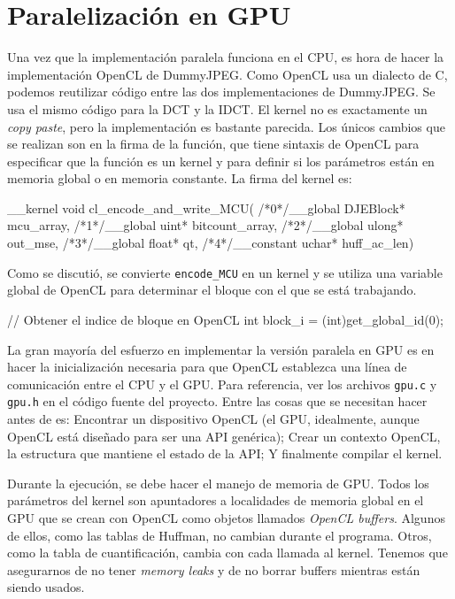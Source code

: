 \section{Paralelización en GPU}

Una vez que la implementación paralela funciona en el CPU, es hora de hacer la
implementación OpenCL de DummyJPEG. Como OpenCL usa un dialecto de C, podemos
reutilizar código entre las dos implementaciones de DummyJPEG. Se usa el mismo
código para la DCT y la IDCT. El kernel no es exactamente un \emph{copy paste},
pero la implementación es bastante parecida. Los únicos cambios que se realizan
son en la firma de la función, que tiene sintaxis de OpenCL para especificar
que la función es un kernel y para definir si los parámetros están en memoria
global o en memoria constante. La firma del kernel es:


\begin{code}[language=C][h]
__kernel void
cl_encode_and_write_MCU(
    /*0*/__global DJEBlock* mcu_array,
    /*1*/__global uint* bitcount_array,
    /*2*/__global ulong* out_mse,
    /*3*/__global float* qt,
    /*4*/__constant uchar* huff_ac_len)
\end{code}

Como se discutió, se convierte \verb+encode_MCU+ en un kernel y se utiliza una
variable global de OpenCL para determinar el bloque con el que se está
trabajando.

\begin{code}[language=C][h]
    // Obtener el indice de bloque en OpenCL
    int block_i = (int)get_global_id(0);
\end{code}

La gran mayoría del esfuerzo en implementar la versión paralela en GPU es en
hacer la inicialización necesaria para que OpenCL establezca una línea de
comunicación entre el CPU y el GPU. Para referencia, ver los archivos
\verb+gpu.c+ y \verb+gpu.h+ en el código fuente del proyecto. Entre las cosas
que se necesitan hacer antes de es: Encontrar un dispositivo OpenCL (el GPU,
idealmente, aunque OpenCL está diseñado para ser una API genérica); Crear un
contexto OpenCL, la estructura que mantiene el estado de la API; Y finalmente
compilar el kernel.

Durante la ejecución, se debe hacer el manejo de memoria de GPU. Todos los
parámetros del kernel son apuntadores a localidades de memoria global en el GPU
que se crean con OpenCL como objetos llamados \emph{OpenCL buffers}. Algunos de
ellos, como las tablas de Huffman, no cambian durante el programa. Otros, como
la tabla de cuantificación, cambia con cada llamada al kernel. Tenemos que
asegurarnos de no tener \emph{memory leaks} y de no borrar buffers mientras
están siendo usados.

